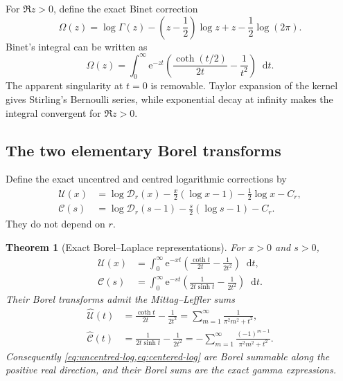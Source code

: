 \documentclass[11pt,a4paper,oneside]{article}
\theoremstyle{plain}
\newtheorem{theorem}{Theorem}[section]
\theoremstyle{definition}
\theoremstyle{remark}
\newcommand{\e}{\mathrm e}
\newcommand{\dd}{\mathop{}\!\mathrm d}
\newcommand{\D}{\mathcal D}
\begin{document}
For $\Re z>0$, define the exact Binet correction
\begin{equation}
 \Omega(z)=\log\Gamma(z)-\left(z-\frac12\right)\log z+z
 -\frac12\log(2\pi).
 \label{eq:Omega-def}
\end{equation}
Binet's integral can be written as
\begin{equation}
 \Omega(z)=\int_0^\infty\e^{-zt}
 \left(\frac{\coth(t/2)}{2t}-\frac1{t^2}\right)\dd t.
 \label{eq:Binet-Laplace}
\end{equation}
The apparent singularity at $t=0$ is removable.  Taylor expansion of the
kernel gives Stirling's Bernoulli series, while exponential decay at infinity
makes the integral convergent for $\Re z>0$.

\subsection{The two elementary Borel transforms}

Define the exact uncentred and centred logarithmic corrections by
\begin{align}
 \mathcal U(x)&=\log\D_r(x)
 -\frac{x}{2}(\log x-1)-\frac12\log x-C_r,
 \label{eq:U-def}\\
 \mathcal C(s)&=\log\D_r(s-1)
 -\frac{s}{2}(\log s-1)-C_r.
 \label{eq:C-def}
\end{align}
They do not depend on $r$.

\begin{theorem}[Exact Borel--Laplace representations]
\label{thm:exact-borel}
For $x>0$ and $s>0$,
\begin{align}
 \mathcal U(x)
 &=\int_0^\infty\e^{-xt}
 \left(\frac{\coth t}{2t}-\frac1{2t^2}\right)\dd t,
 \label{eq:U-Laplace}\\
 \mathcal C(s)
 &=\int_0^\infty\e^{-st}
 \left(\frac{1}{2t\sinh t}-\frac1{2t^2}\right)\dd t.
 \label{eq:C-Laplace}
\end{align}
Their Borel transforms admit the Mittag--Leffler sums
\begin{align}
 \widehat{\mathcal U}(t)
 &=\frac{\coth t}{2t}-\frac1{2t^2}
 =\sum_{m=1}^\infty\frac1{\pi^2m^2+t^2},
 \label{eq:U-partial-fractions}\\
 \widehat{\mathcal C}(t)
 &=\frac{1}{2t\sinh t}-\frac1{2t^2}
 =-\sum_{m=1}^\infty\frac{(-1)^{m-1}}{\pi^2m^2+t^2}.
 \label{eq:C-partial-fractions}
\end{align}
Consequently \cref{eq:uncentred-log,eq:centered-log} are Borel summable along
the positive real direction, and their Borel sums are the exact gamma
expressions.
\end{theorem}
\end{document}
